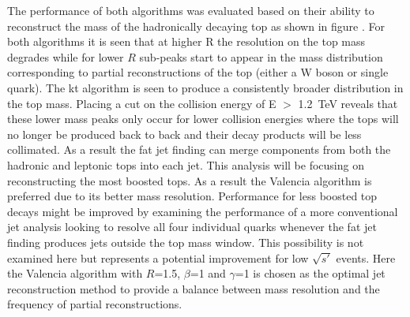 The performance of both algorithms was evaluated based on their ability to reconstruct the mass of the hadronically decaying top as shown in figure . For both algorithms it is seen that at higher R the resolution on the top mass degrades while for lower $R$ sub-peaks start to appear in the mass distribution corresponding to partial reconstructions of the top (either a W boson or single quark). The kt algorithm is seen to produce a consistently broader distribution in the top mass. Placing a cut on the collision energy of E $>$ 1.2~TeV reveals that these lower mass peaks only occur for lower collision energies where the tops will no longer be produced back to back and their decay products will be less collimated. As a result the fat jet finding can merge components from both the hadronic and leptonic tops into each jet. This analysis will be focusing on reconstructing the most boosted tops. As a result the Valencia algorithm is preferred due to its better mass resolution. Performance for less boosted top decays might be improved by examining the performance of a more conventional jet analysis looking to resolve all four individual quarks whenever the fat jet finding produces jets outside the top mass window. This possibility is not examined here but represents a potential improvement for low $\sqrt{s'}$ events. Here the Valencia algorithm with $R$=1.5, $\beta$=1 and $\gamma$=1 is chosen as the optimal jet reconstruction method to provide a balance between mass resolution and the frequency of partial reconstructions. 


